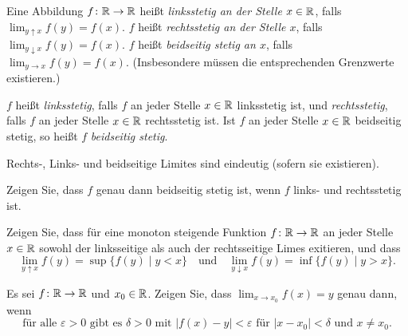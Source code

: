 \documentclass[a4paper,10pt]{article}
\begin{document}
\begin{defi}
 Eine Abbildung $f \colon \mathbb{R} \to \mathbb{R}$ heißt \emph{linksstetig an der Stelle $x \in \mathbb{R}$}, falls $\lim_{y \uparrow x} f(y) = f(x)$. $f$ heißt \emph{rechtsstetig an der Stelle $x$}, falls $\lim_{y \downarrow x} f(y) = f(x)$. $f$ heißt \emph{beidseitig stetig an $x$}, falls $\lim_{y \to x} f(y) = f(x)$. (Insbesondere müssen die entsprechenden Grenzwerte existieren.)
 
 $f$ heißt \emph{linksstetig}, falls $f$ an jeder Stelle $x \in \mathbb{R}$ linksstetig ist, und \emph{rechtsstetig}, falls $f$ an jeder Stelle $x \in \mathbb{R}$ rechtsstetig ist. Ist $f$ an jeder Stelle $x \in \mathbb{R}$ beidseitig stetig, so heißt $f$ \emph{beidseitig stetig}.
\end{defi}


\begin{bem}
 Rechts-, Links- und beidseitige Limites sind eindeutig (sofern sie existieren).
\end{bem}



\begin{question}
 Zeigen Sie, dass $f$ genau dann beidseitig stetig ist, wenn $f$ links- und rechtsstetig ist.
\end{question}


\begin{question}
 Zeigen Sie, dass für eine monoton steigende Funktion $f \colon \mathbb{R} \to \mathbb{R}$ an jeder Stelle $x \in \mathbb{R}$ sowohl der linksseitige als auch der rechtsseitige Limes exitieren, und dass
 \[
  \lim_{y \uparrow x} f(y) = \sup\{f(y) \mid y < x\}
  \quad
  \text{und}
  \quad
  \lim_{y \downarrow x} f(y) = \inf\{f(y) \mid y > x\}.
 \]
\end{question}



\begin{question}\label{qst: Charakterisierung beidseitiger Grenzwert}
 Es sei $f \colon \mathbb{R} \to \mathbb{R}$ und $x_0 \in \mathbb{R}$. Zeigen Sie, dass $\lim_{x \to x_0} f(x) = y$ genau dann, wenn
 \[
  \text{für alle $\varepsilon > 0$ gibt es $\delta > 0$ mit $|f(x)-y| < \varepsilon$ für $|x-x_0| < \delta$ und $x \neq x_0$}.
 \]
\end{question}
\end{document}
